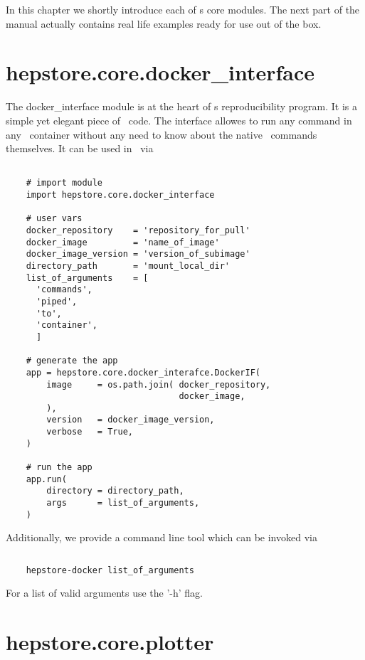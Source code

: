 
In this chapter we shortly introduce each of \hepstore s core
modules. The next part of the manual actually contains real life
examples ready for use out of the box. 

\section{hepstore.core.docker\_interface}

The docker\_interface module is at the heart of \hepstore s
reproducibility program. It is a simple yet elegant piece of
\python~code. The interface allowes to run any command in any
\docker~container without any need to know about the native
\docker~commands themselves. It can be used in \python~via
%
\begin{changemargin}{1.5cm}{1.5cm}
  \centering
  \begin{lstlisting}
    
    # import module
    import hepstore.core.docker_interface

    # user vars
    docker_repository    = 'repository_for_pull'
    docker_image         = 'name_of_image'
    docker_image_version = 'version_of_subimage'
    directory_path       = 'mount_local_dir'
    list_of_arguments    = [
      'commands',
      'piped',
      'to',
      'container',
      ]
    
    # generate the app
    app = hepstore.core.docker_interafce.DockerIF(    
        image     = os.path.join( docker_repository,
                                  docker_image,
        ),
        version   = docker_image_version,
        verbose   = True,
    )

    # run the app
    app.run(
        directory = directory_path,
        args      = list_of_arguments,
    )
  \end{lstlisting}
\end{changemargin}
%
Additionally, we provide a command line tool which can be invoked via
%
\begin{changemargin}{1.5cm}{1.5cm}
  \centering
  \begin{lstlisting}[language=Bash]
    
    hepstore-docker list_of_arguments
  \end{lstlisting}
\end{changemargin}
%
For a list of valid arguments use the '-h' flag.

\section{hepstore.core.plotter}

